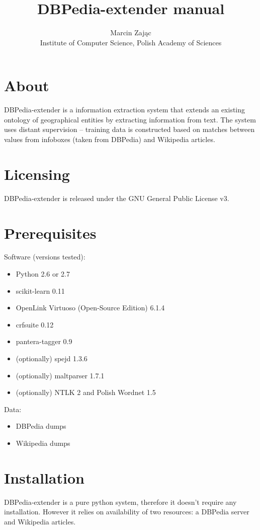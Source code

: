 \documentclass[12pt]{article}
\author{Marcin Zając\\Institute of Computer Science, Polish Academy of Sciences}
\title{DBPedia-extender manual}
\begin{document}
    \maketitle
    \section{About}
    DBPedia-extender is a information extraction system that extends an existing ontology of geographical entities by extracting information from text. The system uses distant supervision – training data is constructed based on matches between values from infoboxes (taken from DBPedia) and Wikipedia articles.
    
    \section{Licensing}
    DBPedia-extender is released under the GNU General Public License v3.

    \section{Prerequisites}
    Software (versions tested):
    \begin{itemize}
        \item Python 2.6 or 2.7
        \item scikit-learn 0.11
        \item OpenLink Virtuoso (Open-Source Edition) 6.1.4
        \item crfsuite 0.12
        \item pantera-tagger 0.9
        \item (optionally) spejd 1.3.6
        \item (optionally) maltparser 1.7.1
        \item (optionally) NTLK 2 and Polish Wordnet 1.5
    \end{itemize}
    Data:
    \begin{itemize}
        \item DBPedia dumps
        \item Wikipedia dumps
    \end{itemize}
    
    \section{Installation}
    DBPedia-extender is a pure python system, therefore it doesn't require any installation.
    However it relies on availability of two resources: a DBPedia server and Wikipedia articles.
\end{document}
